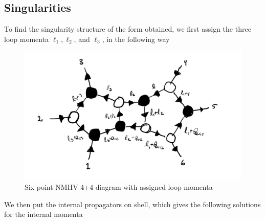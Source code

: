 \documentclass[letter,11pt]{article}
\newcommand{\red}[1]{\textcolor{red}{#1}}
\newcommand{\blue}[1]{\textcolor{blue}{#1}}
\newcommand{\green}[1]{\textcolor{ForestGreen}{#1}}
\newcommand{\orange}[1]{\textcolor{orange}{#1}}
\newcommand{\ab}[1]{\langle #1 \rangle}
\newcommand{\sqb}[1]{[ #1 ]}
\newcommand{\aMs}[3]{\langle #1|#2|#3]}  		%
\begin{document}
\subsection{Singularities}
To find the singularity structure of the form obtained, we first assign the three loop momenta $\ell_1,\ell_2$, and $\ell_3$, in the following way
\begin{figure}[H]
	\centering
	\includegraphics[width=0.5\linewidth]{sing}
	\caption{Six point NMHV 4+4 diagram with assigned loop momenta}
	\label{fig:two-loop}
\end{figure}
\noindent We then put the internal propagators on shell, which gives the following solutions for the internal momenta
\end{document}
